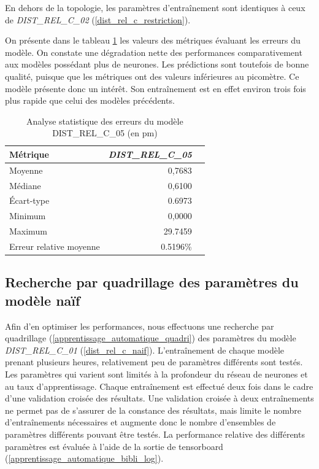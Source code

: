 \par En dehors de la topologie, les paramètres d'entraînement sont identiques à ceux de \emph{DIST\_REL\_C\_02} (\ref{dist_rel_c_restriction}).\\

\par On présente dans le tableau \ref{tstats_dist_rel_c_05} les valeurs des métriques évaluant les erreurs du modèle. On constate une dégradation nette des performances comparativement aux modèles possédant plus de neurones. Les prédictions sont toutefois de bonne qualité, puisque que les métriques ont des valeurs inférieures au picomètre. Ce modèle présente donc un intérêt. Son entraînement est en effet environ trois fois plus rapide que celui des modèles précédents.

\begin{table}
	\centering
	\begin{tabular}{|l|r|r|}
		\hline
		\textbf{Métrique}& \textbf{\emph{DIST\_REL\_C\_05}} \\ \hline
		Moyenne & 0,7683\\ \hline
		Médiane & 0,6100 \\ \hline
		Écart-type  & 0.6973 \\ \hline
		Minimum & 0,0000\\ \hline
		Maximum & 29.7459\\ \hline
		Erreur relative moyenne & 0.5196\%\\ \hline
	\end{tabular}
	
	\caption{Analyse statistique des erreurs du modèle DIST\_REL\_C\_05 (en pm)}
	\label{tstats_dist_rel_c_05}
\end{table}

\subsection{Recherche par quadrillage des paramètres du modèle naïf}

\label{dist_rel_quadri}

\par Afin d'en optimiser les performances, nous effectuons une recherche par quadrillage (\ref{apprentissage_automatique_quadri}) des paramètres du modèle \emph{DIST\_REL\_C\_01} (\ref{dist_rel_c_naif}). L'entraînement de chaque modèle prenant plusieurs heures, relativement peu de paramètres différents sont testés. Les paramètres qui varient sont limités à la profondeur du réseau de neurones et au taux d'apprentissage. Chaque entraînement est effectué deux fois dans le cadre d'une validation croisée des résultats. Une validation croisée à deux entraînements ne permet pas de s'assurer de la constance des résultats, mais limite le nombre d'entraînements nécessaires et augmente donc le nombre d'ensembles de paramètres différents pouvant être testés. La performance relative des différents paramètres est évaluée à l'aide de la sortie de tensorboard (\ref{apprentissage_automatique_bibli_log}).\\

